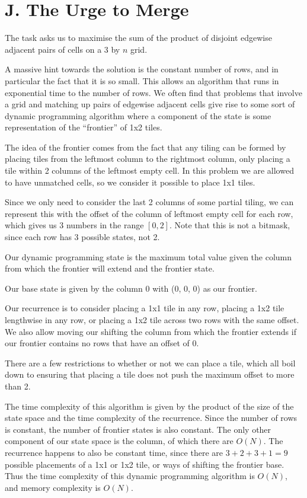 \section*{J. The Urge to Merge}

The task asks us to maximise the sum of the product of disjoint edgewise
adjacent pairs of cells on a $3$ by $n$ grid.

A massive hint towards the solution is the constant number of rows, and in
particular the fact that it is so small. This allows an algorithm that runs in
exponential time to the number of rows. We often find that problems that
involve a grid and matching up pairs of edgewise adjacent cells give rise to
some sort of dynamic programming algorithm where a component of the state is
some representation of the ``frontier'' of 1x2 tiles.

The idea of the frontier comes from the fact that any tiling can be formed by
placing tiles from the leftmost column to the rightmost column, only placing a
tile within 2 columns of the leftmost empty cell. In this problem we are
allowed to have unmatched cells, so we consider it possible to place 1x1 tiles.

Since we only need to consider the last 2 columns of some partial tiling, we
can represent this with the offset of the column of leftmost empty cell for
each row, which gives us 3 numbers in the range $[0, 2]$. Note that this is not
a bitmask, since each row has 3 possible states, not 2.

Our dynamic programming state is the maximum total value given the column from
which the frontier will extend and the frontier state.

Our base state is given by the column 0 with (0, 0, 0) as our frontier.

Our recurrence is to consider placing a 1x1 tile in any row, placing a 1x2 tile
lengthwise in any row, or placing a 1x2 tile across two rows with the same
offset. We also allow moving our shifting the column from which the frontier
extends if our frontier contains no rows that have an offset of 0.

There are a few restrictions to whether or not we can place a tile, which all
boil down to ensuring that placing a tile does not push the maximum offset to
more than 2.

The time complexity of this algorithm is given by the product of the size of
the state space and the time complexity of the recurrence. Since the number of
rows is constant, the number of frontier states is also constant. The only
other component of our state space is the column, of which there are $O(N)$.
The recurrence happens to also be constant time, since there are $3 + 2 + 3 + 1
= 9$ possible placements of a 1x1 or 1x2 tile, or ways of shifting the frontier
base. Thus the time complexity of this dynamic programming algorithm is $O(N)$,
and memory complexity is $O(N)$.

